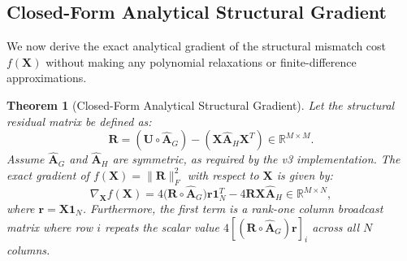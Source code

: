 \documentclass[conference]{IEEEtran}
\newtheorem{theorem}{Theorem}
\begin{document}
\subsection{Closed-Form Analytical Structural Gradient}

We now derive the exact analytical gradient of the structural mismatch cost $f(\mathbf{X})$ without making any polynomial relaxations or finite-difference approximations.

\begin{theorem}[Closed-Form Analytical Structural Gradient]
\label{thm:gradient}
Let the structural residual matrix be defined as:
\begin{equation}
\mathbf{R} = (\mathbf{U} \circ \hat{\mathbf{A}}_G) - (\mathbf{X}\hat{\mathbf{A}}_H\mathbf{X}^T) \in \mathbb{R}^{M \times M}.
\label{eq:residual}
\end{equation}
Assume $\hat{\mathbf{A}}_G$ and $\hat{\mathbf{A}}_H$ are symmetric, as required by the v3 implementation.
The exact gradient of $f(\mathbf{X}) = \|\mathbf{R}\|_F^2$ with respect to $\mathbf{X}$ is given by:
\begin{equation}
\nabla_{\mathbf{X}} f(\mathbf{X}) = 4\big(\mathbf{R} \circ \hat{\mathbf{A}}_G\big)\mathbf{r}\mathbf{1}_N^T - 4\mathbf{R}\mathbf{X}\hat{\mathbf{A}}_H \in \mathbb{R}^{M \times N},
\label{eq:thm1_result}
\end{equation}
where $\mathbf{r} = \mathbf{X}\mathbf{1}_N$. Furthermore, the first term is a rank-one column broadcast matrix where row $i$ repeats the scalar value $4[(\mathbf{R} \circ \hat{\mathbf{A}}_G)\mathbf{r}]_i$ across all $N$ columns.
\end{theorem}
\end{document}
